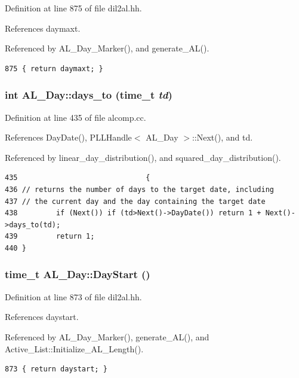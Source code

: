 Definition at line 875 of file dil2al.hh.

References daymaxt.

Referenced by AL\_\-Day\_\-Marker(), and generate\_\-AL().



\footnotesize\begin{verbatim}875 { return daymaxt; }
\end{verbatim}\normalsize 
{}
\subsubsection{\setlength{\rightskip}{0pt plus 5cm}int AL\_\-Day::days\_\-to (time\_\-t {\em td})}\label{classAL__Day_a16}




Definition at line 435 of file alcomp.cc.

References Day\-Date(), PLLHandle$<$ AL\_\-Day $>$::Next(), and td.

Referenced by linear\_\-day\_\-distribution(), and squared\_\-day\_\-distribution().



\footnotesize\begin{verbatim}435                              {
436 // returns the number of days to the target date, including
437 // the current day and the day containing the target date
438         if (Next()) if (td>Next()->DayDate()) return 1 + Next()->days_to(td);
439         return 1;
440 }
\end{verbatim}\normalsize 
{}
\subsubsection{\setlength{\rightskip}{0pt plus 5cm}time\_\-t AL\_\-Day::Day\-Start ()\hspace{0.3cm}{\tt  [inline]}}\label{classAL__Day_a4}




Definition at line 873 of file dil2al.hh.

References daystart.

Referenced by AL\_\-Day\_\-Marker(), generate\_\-AL(), and Active\_\-List::Initialize\_\-AL\_\-Length().



\footnotesize\begin{verbatim}873 { return daystart; }
\end{verbatim}\normalsize 
{}
